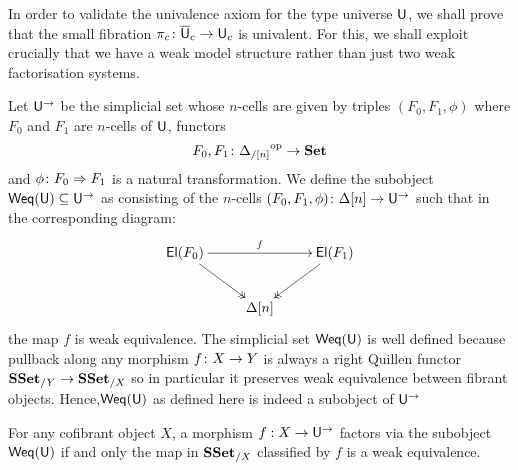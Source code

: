 \documentclass[reqno,10pt,a4paper,oneside,draft]{amsart}
\begin{document}
In order to validate the univalence axiom for the type universe $\mathsf{U}$, we shall prove that the small fibration 
$\pi_c \colon \overline{\mathsf{U}}_c \to \mathsf{U}_c$ is univalent. For this, we shall exploit crucially that we have a weak model
structure rather than just two weak factorisation systems.






 Let $\mathsf{U}^{\rightarrow}$ be the simplicial set whose $n$-cells are given by triples $(F_0, F_1, \phi)$ where
 $F_0$ and $F_1$ are $n$-cells of $\mathsf{U}$, \ie functors
 \[
F_0, F_1 \colon {\Delta_{/[n]}}^{\operatorname{op}} \rightarrow \mathbf{Set}
\]
and $\phi \colon F_0 \Rightarrow F_1$ is a natural transformation. We define the subobject $\mathsf{Weq}(\mathsf{U}) \subseteq \mathsf{U}^{\rightarrow}$ as consisting of the 
$n$-cells $(F_0, F_1, \phi) \colon \Delta[n] \rightarrow \mathsf{U}^{\rightarrow}$ such that in the corresponding diagram:
\[
\xymatrix{ 
\mathsf{El}(F_0) \ar[rr]^{f} \ar@{->>}[dr] & & \mathsf{El}(F_1) \ar@{->>}[dl] \\
& \Delta[n] & }
\]
the map $f$ is weak equivalence. The simplicial set $\mathsf{Weq}(\mathsf{U})$ is well defined because pullback along any morphism $f \colon X \rightarrow Y$ is always a right Quillen functor $\mathbf{SSet}_{/Y} \rightarrow \mathbf{SSet}_{/X}$ so in particular it preserves weak equivalence between fibrant objects. Hence,$\mathsf{Weq}(\mathsf{U})$ as defined here is indeed a subobject of $\mathsf{U}^{\rightarrow}$

\begin{proposition}
\label{prop:Weq_classify_Weq}
For any cofibrant object $X$, a morphism $f:X \rightarrow \mathsf{U}^{\rightarrow}$ factors via the subobject $\mathsf{Weq}(\mathsf{U})$ if and only the map in $\mathbf{SSet}_{/X}$ classified by $f$ is a weak equivalence.

\end{proposition}
\end{document}
